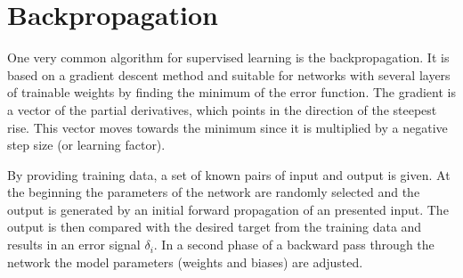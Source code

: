 \section{Backpropagation} \label{sec:backpropagation}

One very common algorithm for supervised learning is the backpropagation. It is based on a gradient descent method and suitable for networks with several layers of trainable weights by finding the minimum of the error function. The gradient is a vector of the partial derivatives, which points in the direction of the steepest rise. This vector moves towards the minimum since it is multiplied by a negative step size (or learning factor).

By providing training data, a set of known pairs of input and output is given. At the beginning the parameters of the network are randomly selected and the output is generated by an initial forward propagation of an presented input. The output is then compared with the desired target from the training data and results in an error signal $\delta_{i}$. In a second phase of a backward pass through the network the model parameters (weights and biases) are adjusted. 




